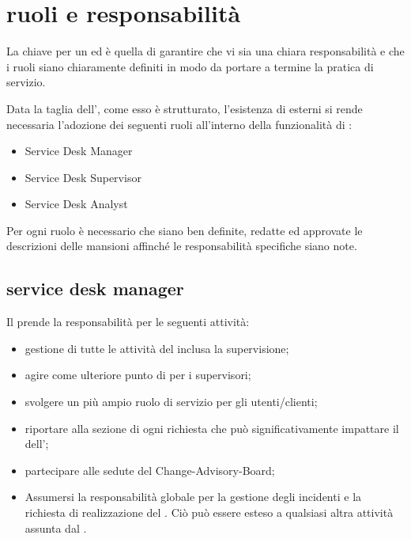 %
%
\section[Ruoli e responsabilità]{ruoli e responsabilità}
\label{sd-roles-responsabilities}
La chiave per un   ed  è quella di garantire che vi sia una chiara responsabilità e che i ruoli siano chiaramente definiti in modo da portare a termine la pratica di servizio.

Data la taglia dell'\entity{}, come esso è strutturato, l'esistenza di  esterni si rende necessaria l'adozione dei seguenti ruoli all'interno della funzionalità di :

\begin{itemize}
\item{Service Desk Manager}
\item{Service Desk Supervisor}
\item{Service Desk Analyst}
\end{itemize}

Per ogni ruolo è necessario che siano ben definite, redatte ed approvate le descrizioni delle mansioni affinché le responsabilità specifiche siano note.

\subsection[Service Desk Manager]{service desk manager}
\label{sd-sd-manger}
Il  prende la responsabilità per le seguenti attività:

\begin{itemize}
\item{gestione di tutte le attività del  inclusa la supervisione;}
\item{agire come ulteriore punto di  per i supervisori;}
\item{svolgere un più ampio ruolo di servizio per gli utenti/clienti;}
\item{riportare alla sezione di  ogni richiesta che può significativamente impattare il  dell'\entity{};}
\item{partecipare alle sedute del \ac{Change-Advisory-Board};}
\item{Assumersi la responsabilità globale per la gestione degli incidenti e la richiesta di realizzazione del . Ciò può essere esteso a qualsiasi altra attività assunta dal .}
\end{itemize}


